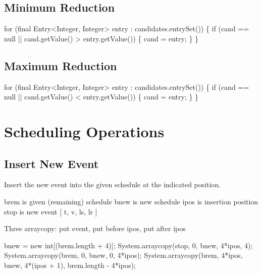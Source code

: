 \section{Minimum Reduction}

\nwenddocs{}\endmoddef\nwstartdeflinemarkup{}\nwenddeflinemarkup
for (final Entry<Integer, Integer> entry : candidates.entrySet()) \{
  if (cand == null || cand.getValue() > entry.getValue()) \{
    cand = entry;
  \}
\}
\nwendcode{}\nwdocspar

\section{Maximum Reduction}

\nwenddocs{}\endmoddef\nwstartdeflinemarkup\nwenddeflinemarkup
for (final Entry<Integer, Integer> entry : candidates.entrySet()) \{
  if (cand == null || cand.getValue() < entry.getValue()) \{
    cand = entry;
  \}
\}
\nwendcode{}\nwdocspar

\nwenddocs{}\chapter{Scheduling Operations}
\label{search-scheduling}

\section{Insert New Event}

Insert the new event into the given schedule at the indicated position.

brem is given (remaining) schedule
bnew is new schedule
ipos is insertion position
stop is new event [ t, v, ls, lr ]

Three arraycopy: put event, put before ipos, put after ipos

\nwenddocs{}\endmoddef\nwstartdeflinemarkup{}\nwenddeflinemarkup
bnew = new int[(brem.length + 4)];
System.arraycopy(stop, 0, bnew, 4*ipos, 4);
System.arraycopy(brem, 0, bnew, 0, 4*ipos);
System.arraycopy(brem, 4*ipos, bnew, 4*(ipos + 1), brem.length - 4*ipos);
\nwendcode{}\nwdocspar

